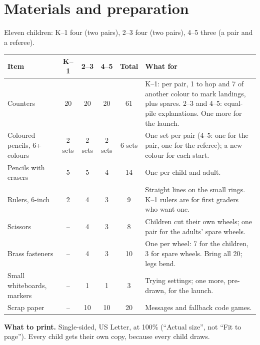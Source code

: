 \documentclass[11pt]{article}
\begin{document}
\section{Materials and preparation}

Eleven children: K--1 four (two pairs), 2--3 four (two pairs), 4--5 three (a pair and a referee).

{\small\begin{tabularx}{\textwidth}{@{}l c c c c L@{}}
\toprule
Item & K--1 & 2--3 & 4--5 & Total & What for \\
\midrule
Counters & 20 & 20 & 20 & 61 & K--1: per pair, 1 to hop and 7 of another colour to mark landings, plus spares.
  2--3 and 4--5: equal-pile explanations. One more for the launch. \\
Coloured pencils, 6+ colours & 2 sets & 2 sets & 2 sets & 6 sets & One set per pair (4--5: one for the pair, one for the referee); a new colour for each start. \\
Pencils with erasers & 5 & 5 & 4 & 14 & One per child and adult. \\
Rulers, 6-inch & 2 & 4 & 3 & 9 & Straight lines on the small rings. K--1 rulers are for first graders who want one. \\
Scissors & -- & 4 & 3 & 8 & Children cut their own wheels; one pair for the adults' spare wheels. \\
Brass fasteners & -- & 4 & 3 & 10 & One per wheel: 7 for the children, 3 for spare wheels. Bring all 20; legs bend. \\
Small whiteboards, markers & -- & 1 & 1 & 3 & Trying settings; one more, pre-drawn, for the launch. \\
Scrap paper & -- & 10 & 10 & 20 & Messages and fallback code games. \\
\bottomrule
\end{tabularx}}

\medskip
\textbf{What to print.} Single-sided, US Letter, at 100\% (``Actual size'', not ``Fit to page''). Every child
gets their own copy, because every child draws.
\end{document}
